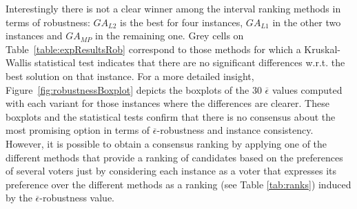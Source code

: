 \documentclass[12pt,halfline,a4paper]{ouparticle}
\begin{document}
\begin{table}[htb]
\small
\centering
\caption{$\overline{\epsilon} (\times 10^3)$ values for all variants of the GA}
\label{table:expResultsRob}
\end{table}

Interestingly there is not a clear winner among the interval ranking methods in terms of robustness: $GA_{L2}$ is the best for four instances, $GA_{L1}$ in the other two instances and $GA_{MP}$ in the remaining one.  Grey cells on Table~\ref{table:expResultsRob} correspond to those methods for which a Kruskal-Wallis statistical test indicates that there are no significant differences w.r.t. the best solution on that instance.  For a more detailed insight, Figure~\ref{fig:robustnessBoxplot} depicts the boxplots of the 30 $\overline{\epsilon}$ values computed with each variant for those instances where the differences are clearer. These boxplots and the statistical tests confirm that there is no consensus about the most promising option in terms of $\overline{\epsilon}$-robustness and instance consistency. However, it is possible to obtain a consensus ranking by applying one of the different methods that provide a ranking of candidates based on the preferences of several voters just by considering each instance as a voter that expresses its preference over the different methods as a ranking (see Table \ref{tab:ranks}) induced by the $\overline{\epsilon}$-robustness value. 
\end{document}
